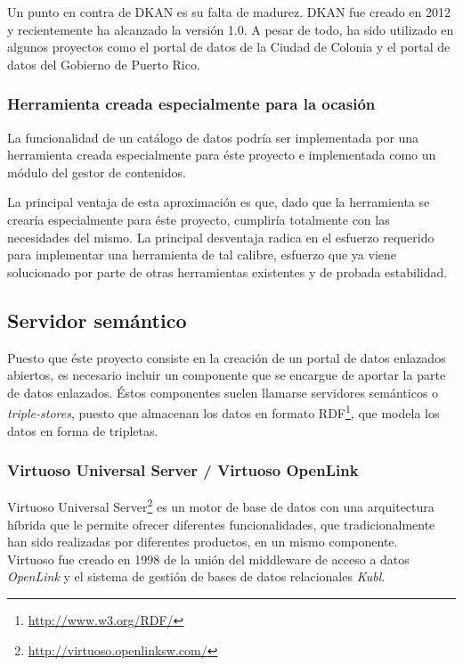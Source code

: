 Un punto en contra de DKAN es su falta de madurez.  DKAN fue creado en 2012 y recientemente ha alcanzado la versión 1.0.  A pesar de todo, ha sido utilizado en algunos proyectos como el portal de datos de la Ciudad de Colonia y el portal de datos del Gobierno de Puerto Rico.


\subsubsection{Herramienta creada especialmente para la ocasión}
La funcionalidad de un catálogo de datos podría ser implementada por una herramienta creada especialmente para éste proyecto e implementada como un módulo del gestor de contenidos.

La principal ventaja de esta aproximación es que, dado que la herramienta se crearía especialmente para éste proyecto, cumpliría totalmente con las necesidades del mismo.  La principal desventaja radica en el esfuerzo requerido para implementar una herramienta de tal calibre, esfuerzo que ya viene solucionado por parte de otras herramientas existentes y de probada estabilidad.



\subsection{Servidor semántico}
Puesto que éste proyecto consiste en la creación de un portal de datos enlazados abiertos, es necesario incluir un componente que se encargue de aportar la parte de datos enlazados.  Éstos componentes suelen llamarse servidores semánticos o \textit{triple-stores}, puesto que almacenan los datos en formato RDF\footnote{\url{http://www.w3.org/RDF/}}, que modela los datos en forma de tripletas.


\subsubsection{Virtuoso Universal Server / Virtuoso OpenLink}
Virtuoso Universal Server\footnote{\url{http://virtuoso.openlinksw.com/}} es un motor de base de datos con una arquitectura híbrida que le permite ofrecer diferentes funcionalidades, que tradicionalmente han sido realizadas por diferentes productos, en un mismo componente.\\
Virtuoso fue creado en 1998 de la unión del middleware de acceso a datos \textit{OpenLink}  y el sistema de gestión de bases de datos relacionales \textit{Kubl}.


